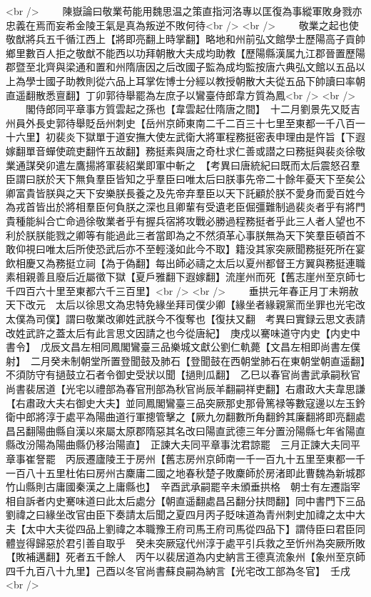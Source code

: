 <br />
　　陳嶽論曰敬業苟能用魏思温之策直指河洛專以匡復為事縱軍敗身戮亦忠義在焉而妄希金陵王氣是真為叛逆不敗何待<br />
<br />
　　敬業之起也使敬猷將兵五千循江西上【將即亮翻上時掌翻】略地和州前弘文館學士歷陽高子貢帥鄉里數百人拒之敬猷不能西以功拜朝散大夫成均助教【歷陽縣漢属九江郡晉置歷陽郡暨至北齊與梁通和置和州隋唐因之后改國子監為成均監按唐六典弘文館以五品以上為學士國子助教則從六品上耳掌佐博士分經以教授朝散大夫從五品下帥讀曰率朝直遥翻散悉亶翻】丁卯郭待舉罷為左庶子以鸞臺侍郎韋方質為鳳<br />
<br />
　　閣侍郎同平章事方質雲起之孫也【韋雲起仕隋唐之間】　十二月劉景先又貶吉州員外長史郭待舉貶岳州刺史【岳州京師東南二千二百三十七里至東都一千八百一十六里】初裴炎下獄單于道安撫大使左武衛大將軍程務挺密表申理由是忤旨【下遐嫁翻單音蟬使疏吏翻忤五故翻】務挺素與唐之奇杜求仁善或譛之曰務挺與裴炎徐敬業通謀癸卯遣左鷹揚將軍裴紹業即軍中斬之　【考異曰唐統紀曰既而太后震怒召羣臣謂曰朕於天下無負羣臣皆知之乎羣臣曰唯太后曰朕事先帝二十餘年憂天下至矣公卿富貴皆朕與之天下安樂朕長養之及先帝弃羣臣以天下託顧於朕不愛身而愛百姓今為戎首皆出於將相羣臣何負朕之深也且卿輩有受遺老臣倔彊難制過裴炎者乎有將門貴種能糾合亡命過徐敬業者乎有握兵宿將攻戰必勝過程務挺者乎此三人者人望也不利於朕朕能戮之卿等有能過此三者當即為之不然須革心事朕無為天下笑羣臣頓首不敢仰視曰唯太后所使恐武后亦不至輕淺如此今不取】籍没其家突厥聞務挺死所在宴飲相慶又為務挺立祠【為于偽翻】每出師必禱之太后以夏州都督王方翼與務挺連職素相親善且廢后近屬徵下獄【夏戶雅翻下遐嫁翻】流崖州而死【舊志崖州至京師七千四百六十里至東都六千三百里】<br />
<br />
　　垂拱元年春正月丁未朔赦天下改元　太后以徐思文為忠特免緣坐拜司僕少卿【緣坐者緣親黨而坐罪也光宅改太僕為司僕】謂曰敬業改卿姓武朕今不復奪也【復扶又翻　考異曰實録云思文表請改姓武許之蓋太后有此言思文因請之也今從唐紀】　庚戍以騫味道守内史【内史中書令】　戊辰文昌左相同鳳閣鸞臺三品樂城文獻公劉仁軌薨【文昌左相即尚書左僕射】　二月癸未制朝堂所置登聞鼓及肺石【登聞鼓在西朝堂肺石在東朝堂朝直遥翻】不須防守有撾鼓立石者令御史受狀以聞【撾則瓜翻】　乙巳以春官尚書武承嗣秋官尚書裴居道【光宅以禮部為春官刑部為秋官尚辰羊翻嗣祥吏翻】右肅政大夫韋思謙【右肅政大夫右御史大夫】並同鳳閣鸞臺三品突厥那史那骨篤禄等數寇邊以左玉鈐衛中郎將淳于處平為陽曲道行軍摠管擊之【厥九勿翻數所角翻鈐其廉翻將即亮翻處昌呂翻陽曲縣自漢以來屬太原郡隋惡其名改曰陽直武德三年分置汾陽縣七年省陽直縣改汾陽為陽曲縣仍移治陽直】　正諫大夫同平章事沈君諒罷　三月正諫大夫同平章事崔詧罷　丙辰遷廬陵王于房州【舊志房州京師南一千一百九十五里至東都一千一百八十五里杜佑曰房州古麇庸二國之地春秋楚子敗麇師於房渚即此曹魏為新城郡竹山縣則古庸國秦漢之上庸縣也】　辛酉武承嗣罷辛未頒垂拱格　朝士有左遷詣宰相自訴者内史騫味道曰此太后處分【朝直遥翻處昌呂翻分扶問翻】同中書門下三品劉禕之曰緣坐改官由臣下奏請太后聞之夏四月丙子貶味道為青州刺史加禕之太中大夫【太中大夫從四品上劉禕之本職豫王府司馬王府司馬從四品下】謂侍臣曰君臣同體豈得歸惡於君引善自取乎　癸未突厥寇代州淳于處平引兵救之至忻州為突厥所敗【敗補邁翻】死者五千餘人　丙午以裴居道為内史納言王德真流象州【象州至京師四千九百八十九里】己酉以冬官尚書蘇良嗣為納言【光宅改工部為冬官】　壬戌<br />
